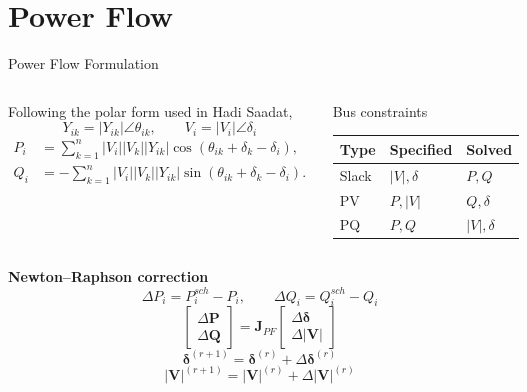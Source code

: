 \documentclass{beamer}
\begin{document}
\section{Power Flow}
\begin{frame}{Power Flow Formulation}
\begin{columns}[t,onlytextwidth]
\scriptsize
Following the polar form used in Hadi Saadat,
\[
Y_{ik}=|Y_{ik}|\angle\theta_{ik},\qquad V_i=|V_i|\angle\delta_i
\]
\begin{align*}
P_i&=\sum_{k=1}^{n}|V_i||V_k||Y_{ik}|\cos(\theta_{ik}+\delta_k-\delta_i),\\
Q_i&=-\sum_{k=1}^{n}|V_i||V_k||Y_{ik}|\sin(\theta_{ik}+\delta_k-\delta_i).
\end{align*}
\scriptsize
\begin{block}{Bus constraints}
\centering
\setlength{\tabcolsep}{3.5pt}
\begin{tabular}{lll}
\toprule
Type & Specified & Solved \\
\midrule
Slack & $|V|,\delta$ & $P,Q$ \\
PV & $P,|V|$ & $Q,\delta$ \\
PQ & $P,Q$ & $|V|,\delta$ \\
\bottomrule
\end{tabular}
\end{block}
\end{columns}
\vspace{0.10cm}
\scriptsize
\textbf{Newton--Raphson correction}
\[
\Delta P_i=P_i^{sch}-P_i,\qquad \Delta Q_i=Q_i^{sch}-Q_i
\]
\[
\boxed{\begin{bmatrix}\Delta\bm P\\\Delta\bm Q\end{bmatrix}
=\bm J_{PF}\begin{bmatrix}\Delta\bm\delta\\\Delta|\bm V|\end{bmatrix}}
\]
\[
\bm\delta^{(r+1)}=\bm\delta^{(r)}+\Delta\bm\delta^{(r)}
\]
\[
|\bm V|^{(r+1)}=|\bm V|^{(r)}+\Delta|\bm V|^{(r)}
\]
\end{frame}
\end{document}
